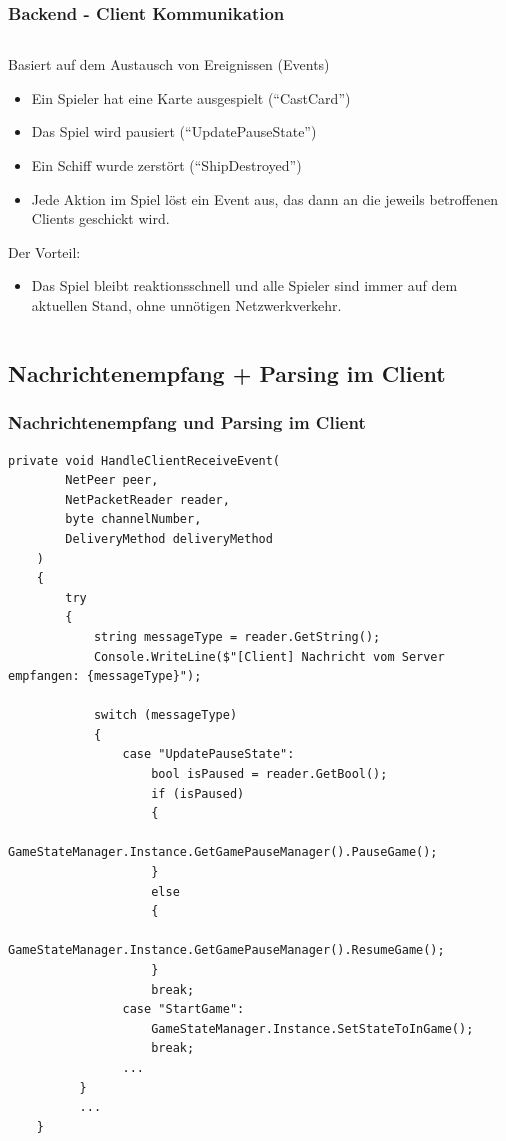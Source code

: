 \documentclass{beamer}
\begin{document}
\begin{frame}[fragile]
\frametitle{Backend - Client Kommunikation}
  \begin{columns}
  \begin{column}{0.85\textwidth}
    Basiert auf dem Austausch von Ereignissen (Events)
    \begin{itemize}
      \item Ein Spieler hat eine Karte ausgespielt (``CastCard'')
      \item Das Spiel wird pausiert (``UpdatePauseState'')
      \item Ein Schiff wurde zerstört (``ShipDestroyed'')
      \item Jede Aktion im Spiel löst ein Event aus, das dann an die jeweils betroffenen Clients geschickt wird.
    \end{itemize}
    
    Der Vorteil:
    \begin{itemize}
      \item Das Spiel bleibt reaktionsschnell und alle Spieler sind immer auf dem aktuellen Stand, ohne unnötigen Netzwerkverkehr.
    \end{itemize}
  \end{column}
  \end{columns}
\end{frame}

\subsection{Nachrichtenempfang + Parsing im Client}
\begin{frame}[fragile]
\frametitle{Nachrichtenempfang und Parsing im Client}
  \begin{lstlisting}[language=CSharp, basicstyle=\ttfamily\tiny, breaklines=true]
     private void HandleClientReceiveEvent(
        NetPeer peer,
        NetPacketReader reader,
        byte channelNumber,
        DeliveryMethod deliveryMethod
    )
    {
        try
        {
            string messageType = reader.GetString();
            Console.WriteLine($"[Client] Nachricht vom Server empfangen: {messageType}");

            switch (messageType)
            {
                case "UpdatePauseState":
                    bool isPaused = reader.GetBool();
                    if (isPaused)
                    {
                        GameStateManager.Instance.GetGamePauseManager().PauseGame();
                    }
                    else
                    {
                        GameStateManager.Instance.GetGamePauseManager().ResumeGame();
                    }
                    break;
                case "StartGame":
                    GameStateManager.Instance.SetStateToInGame();
                    break;
                ...
          }
          ...
    }
  \end{lstlisting}
\end{frame}
\end{document}
